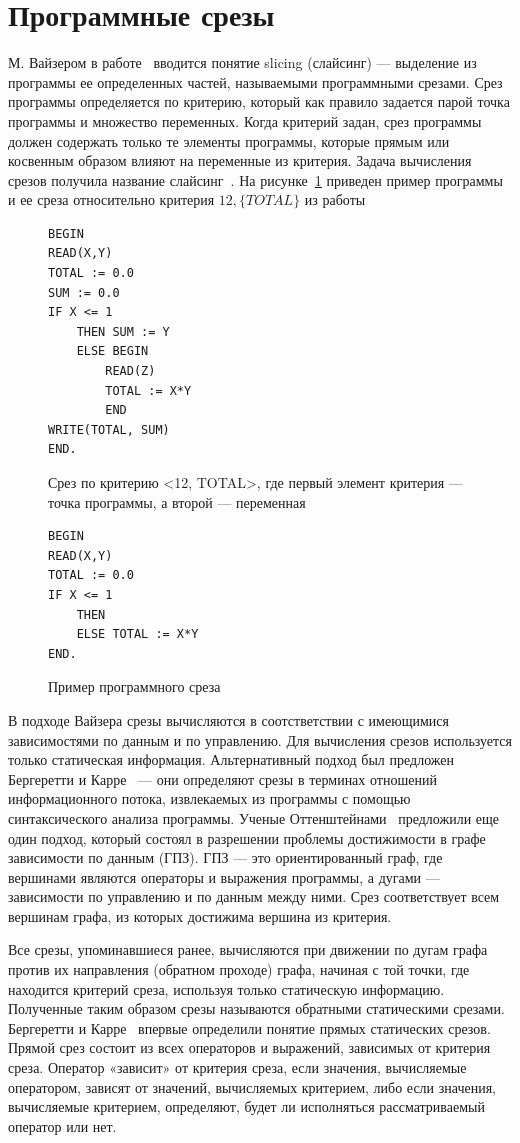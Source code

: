\section{Программные срезы}
М. Вайзером в работе~\cite{weiser1981program} вводится понятие slicing (слайсинг) --- выделение из программы ее определенных частей, называемыми программными срезами. Срез программы определяется по критерию, который как правило задается парой точка программы и множество переменных. Когда критерий задан, срез программы должен содержать только те элементы программы, которые прямым или косвенным образом влияют на переменные из критерия. Задача вычисления срезов получила название слайсинг~\cite{2002slicing}. На рисунке~\ref{ex:slice} приведен пример программы и ее среза относительно критерия \(12, \{TOTAL\}\) из работы~\cite{weiser1981program}
\begin{figure}[]
\begin{lstlisting}
BEGIN
READ(X,Y)
TOTAL := 0.0
SUM := 0.0
IF X <= 1
	THEN SUM := Y
	ELSE BEGIN
		READ(Z)
		TOTAL := X*Y
		END
WRITE(TOTAL, SUM)
END.
\end{lstlisting}
Срез по критерию <12, {TOTAL}>, где первый элемент критерия --- точка программы, а второй --- переменная
\begin{lstlisting}
BEGIN
READ(X,Y)
TOTAL := 0.0
IF X <= 1
	THEN 
	ELSE TOTAL := X*Y
END.
\end{lstlisting}
\caption{Пример программного среза}
\label{ex:slice}
\end{figure}
В подходе Вайзера срезы вычисляются в соотстветствии с имеющимися зависимостями по данным и по управлению. Для вычисления срезов используется только статическая информация. Альтернативный подход был предложен Бергеретти и Карре~\cite{bergeretti1985information} --- они определяют срезы в терминах отношений информационного потока, извлекаемых из программы с помощью синтаксического анализа программы. Ученые Оттенштейнами~\cite{ottenstein1984program} предложили еще один подход, который состоял в разрешении проблемы достижимости в графе зависимости по данным (ГПЗ). ГПЗ --- это ориентированный граф, где вершинами являются операторы и выражения программы, а дугами --- зависимости по управлению и по данным между ними. Срез соответствует всем вершинам графа, из которых достижима вершина из критерия.

Все срезы, упоминавшиеся ранее, вычисляются при движении по дугам графа против их направления (обратном проходе) графа, начиная с той точки, где находится критерий среза, используя только статическую информацию. Полученные таким образом срезы называются обратными статическими срезами. Бергеретти и Карре~\cite{bergeretti1985information} впервые определили понятие прямых статических срезов. Прямой срез состоит из всех операторов и выражений, зависимых от критерия среза. Оператор «зависит» от критерия среза, если значения, вычисляемые оператором, зависят от значений, вычисляемых критерием, либо если значения, вычисляемые критерием, определяют, будет ли исполняться рассматриваемый оператор или нет. 

